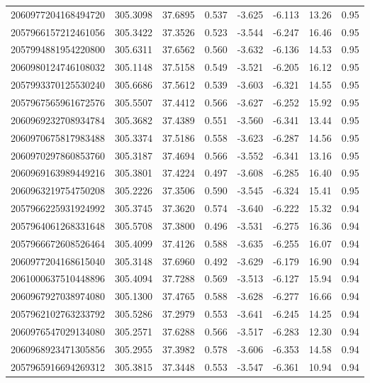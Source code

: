 \begin{longtable}{lccccccc}
2060977204168494720 & 305.3098 & 37.6895 & 0.537 & -3.625 & -6.113 & 13.26 & 0.95 \\
2057966157212461056 & 305.3422 & 37.3526 & 0.523 & -3.544 & -6.247 & 16.46 & 0.95 \\
2057994881954220800 & 305.6311 & 37.6562 & 0.560 & -3.632 & -6.136 & 14.53 & 0.95 \\
2060980124746108032 & 305.1148 & 37.5158 & 0.549 & -3.521 & -6.205 & 16.12 & 0.95 \\
2057993370125530240 & 305.6686 & 37.5612 & 0.539 & -3.603 & -6.321 & 14.55 & 0.95 \\
2057967565961672576 & 305.5507 & 37.4412 & 0.566 & -3.627 & -6.252 & 15.92 & 0.95 \\
2060969232708934784 & 305.3682 & 37.4389 & 0.551 & -3.560 & -6.341 & 13.44 & 0.95 \\
2060970675817983488 & 305.3374 & 37.5186 & 0.558 & -3.623 & -6.287 & 14.56 & 0.95 \\
2060970297860853760 & 305.3187 & 37.4694 & 0.566 & -3.552 & -6.341 & 13.16 & 0.95 \\
2060969163989449216 & 305.3801 & 37.4224 & 0.497 & -3.608 & -6.285 & 16.40 & 0.95 \\
2060963219754750208 & 305.2226 & 37.3506 & 0.590 & -3.545 & -6.324 & 15.41 & 0.95 \\
2057966225931924992 & 305.3745 & 37.3620 & 0.574 & -3.640 & -6.222 & 15.32 & 0.94 \\
2057964061268331648 & 305.5708 & 37.3800 & 0.496 & -3.531 & -6.275 & 16.36 & 0.94 \\
2057966672608526464 & 305.4099 & 37.4126 & 0.588 & -3.635 & -6.255 & 16.07 & 0.94 \\
2060977204168615040 & 305.3148 & 37.6960 & 0.492 & -3.629 & -6.179 & 16.90 & 0.94 \\
2061000637510448896 & 305.4094 & 37.7288 & 0.569 & -3.513 & -6.127 & 15.94 & 0.94 \\
2060967927038974080 & 305.1300 & 37.4765 & 0.588 & -3.628 & -6.277 & 16.66 & 0.94 \\
2057962102763233792 & 305.5286 & 37.2979 & 0.553 & -3.641 & -6.245 & 14.25 & 0.94 \\
2060976547029134080 & 305.2571 & 37.6288 & 0.566 & -3.517 & -6.283 & 12.30 & 0.94 \\
2060968923471305856 & 305.2955 & 37.3982 & 0.578 & -3.606 & -6.353 & 14.58 & 0.94 \\
2057965916694269312 & 305.3815 & 37.3448 & 0.553 & -3.547 & -6.361 & 10.94 & 0.94 \\

\end{longtable}
